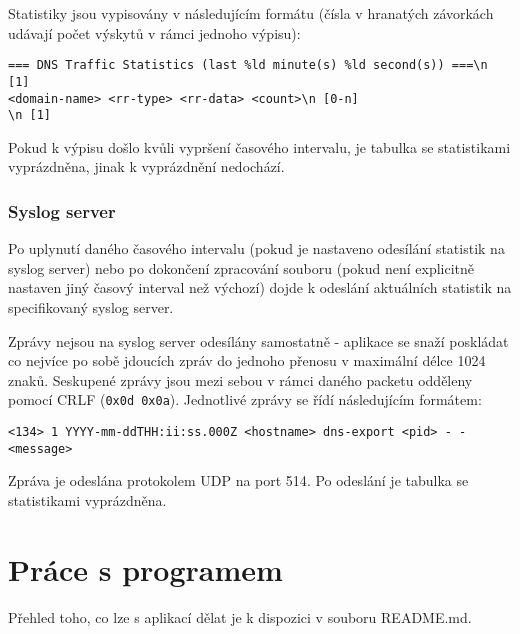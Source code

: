 \documentclass[11pt]{article}
\begin{document}
	Statistiky jsou vypisovány v následujícím formátu (čísla v hranatých závorkách udávají počet výskytů v rámci jednoho výpisu):
	\begin{verbatim}
=== DNS Traffic Statistics (last %ld minute(s) %ld second(s)) ===\n [1]
<domain-name> <rr-type> <rr-data> <count>\n [0-n]
\n [1]
	\end{verbatim}
	
	Pokud k výpisu došlo kvůli vypršení časového intervalu, je tabulka se statistikami vyprázdněna, jinak k vyprázdnění nedochází.
	
	\subsubsection{Syslog server}
	Po uplynutí daného časového intervalu (pokud je nastaveno odesílání statistik na syslog server) nebo po dokončení zpracování souboru (pokud není explicitně nastaven jiný časový interval než výchozí) dojde k odeslání aktuálních statistik na specifikovaný syslog server.
	
	Zprávy nejsou na syslog server odesílány samostatně - aplikace se snaží poskládat co nejvíce po sobě jdoucích zpráv do jednoho přenosu v maximální délce 1024 znaků.
	Seskupené zprávy jsou mezi sebou v rámci daného packetu odděleny pomocí CRLF (\texttt{0x0d 0x0a}). Jednotlivé zprávy se řídí následujícím formátem:
	\begin{verbatim}
<134> 1 YYYY-mm-ddTHH:ii:ss.000Z <hostname> dns-export <pid> - - <message>
	\end{verbatim}
	
	Zpráva je odeslána protokolem UDP na port 514\cite{RFC5424}.
	Po odeslání je tabulka se statistikami vyprázdněna.
	
	
	\section{Práce s programem}
	Přehled toho, co lze s aplikací dělat je k dispozici v souboru \textsf{README.md}.
	
	\newpage
	
	
	
\end{document}
